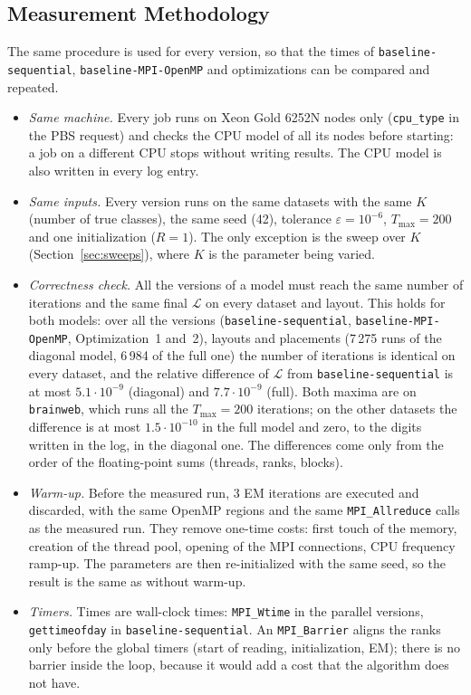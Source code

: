 \documentclass[conference,onecolumn]{IEEEtran}
\newcommand{\vseq}{\texttt{baseline-\allowbreak sequential}}
\newcommand{\vbase}{\texttt{baseline-\allowbreak MPI-\allowbreak OpenMP}}
\begin{document}
\subsection{Measurement Methodology}\label{sec:method}
The same procedure is used for every version, so that the times of \vseq{}, \vbase{} and optimizations can be compared and repeated.
\begin{itemize}
\item \emph{Same machine.} Every job runs on Xeon Gold 6252N nodes only (\texttt{cpu\_type} in the PBS request) and checks the CPU model of all its nodes before starting: a job on a different CPU stops without writing results. The CPU model is also written in every log entry.
\item \emph{Same inputs.} Every version runs on the same datasets with the same $K$ (number of true classes), the same seed (42), tolerance $\varepsilon=10^{-6}$, $T_{\max}=200$ and one initialization ($R=1$). The only exception is the sweep over $K$ (Section~\ref{sec:sweeps}), where $K$ is the parameter being varied.
\item \emph{Correctness check.} All the versions of a model must reach the same number of iterations and the same final $\mathcal{L}$ on every dataset and layout. This holds for both models: over all the versions (\vseq{}, \vbase{}, Optimization~1 and~2), layouts and placements (7\,275 runs of the diagonal model, 6\,984 of the full one) the number of iterations is identical on every dataset, and the relative difference of $\mathcal{L}$ from \vseq{} is at most $5.1\cdot10^{-9}$ (diagonal) and $7.7\cdot10^{-9}$ (full). Both maxima are on \texttt{brainweb}, which runs all the $T_{\max}=200$ iterations; on the other datasets the difference is at most $1.5\cdot10^{-10}$ in the full model and zero, to the digits written in the log, in the diagonal one. The differences come only from the order of the floating-point sums (threads, ranks, blocks).
\item \emph{Warm-up.} Before the measured run, 3 EM iterations are executed and discarded, with the same OpenMP regions and the same \texttt{MPI\_Allreduce} calls as the measured run. They remove one-time costs: first touch of the memory, creation of the thread pool, opening of the MPI connections, CPU frequency ramp-up. The parameters are then re-initialized with the same seed, so the result is the same as without warm-up.
\item \emph{Timers.} Times are wall-clock times: \texttt{MPI\_Wtime} in the parallel versions, \texttt{gettimeofday} in \vseq{}. An \texttt{MPI\_Barrier} aligns the ranks only before the global timers (start of reading, initialization, EM); there is no barrier inside the loop, because it would add a cost that the algorithm does not have.

\end{itemize}
\end{document}
